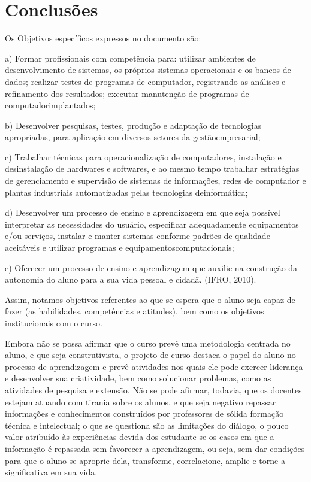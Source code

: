 \documentclass[article,12pt,onesidea,4paper,english,brazil]{abntex2}
\begin{document}
	\section*{Conclusões}
	
Os Objetivos específicos expressos no documento são:
	\begin{citacao}
a)	Formar profissionais com competência para: utilizar ambientes de desenvolvimento de sistemas, os próprios sistemas operacionais e os bancos de dados; realizar testes de programas de computador, registrando as análises e refinamento dos resultados; executar manutenção de programas de computadorimplantados;

b)	Desenvolver pesquisas, testes, produção e adaptação de tecnologias apropriadas, para aplicação em diversos setores da gestãoempresarial;

c)	Trabalhar técnicas para operacionalização de computadores, instalação e desinstalação de hardwares e softwares, e ao mesmo tempo trabalhar estratégias de gerenciamento e supervisão de sistemas de informações, redes de computador e plantas industriais automatizadas pelas tecnologias deinformática;

d)	Desenvolver um processo de ensino e aprendizagem em que seja possível interpretar as necessidades do usuário, especificar  adequadamente equipamentos e/ou serviços, instalar e manter sistemas conforme padrões de qualidade aceitáveis e utilizar programas e equipamentoscomputacionais;

e)	Oferecer um processo de ensino e aprendizagem que auxilie na construção da autonomia do aluno para a sua vida pessoal e cidadã. (IFRO, 2010).

\end{citacao}

Assim, notamos objetivos referentes ao que se espera que o aluno seja capaz de fazer (as habilidades, competências e atitudes), bem como os objetivos institucionais com o curso.

Embora não se possa afirmar que o curso prevê uma metodologia centrada no aluno, e que seja construtivista, o projeto de curso destaca o papel do aluno no processo de aprendizagem e prevê atividades nos quais ele pode exercer liderança e desenvolver sua criatividade, bem como solucionar problemas, como as atividades de pesquisa e extensão. Não se pode afirmar, todavia, que os docentes estejam atuando com tirania sobre os alunos, e que seja negativo repassar informações e conhecimentos construídos por professores de sólida formação técnica e intelectual; o que se questiona são as limitações do diálogo, o pouco valor atribuído às experiências devida dos estudante se os casos em que a informação é repassada sem favorecer a aprendizagem, ou seja, sem dar condições para que o aluno se aproprie dela, transforme, correlacione, amplie e torne-a significativa em sua vida.
\end{document}
